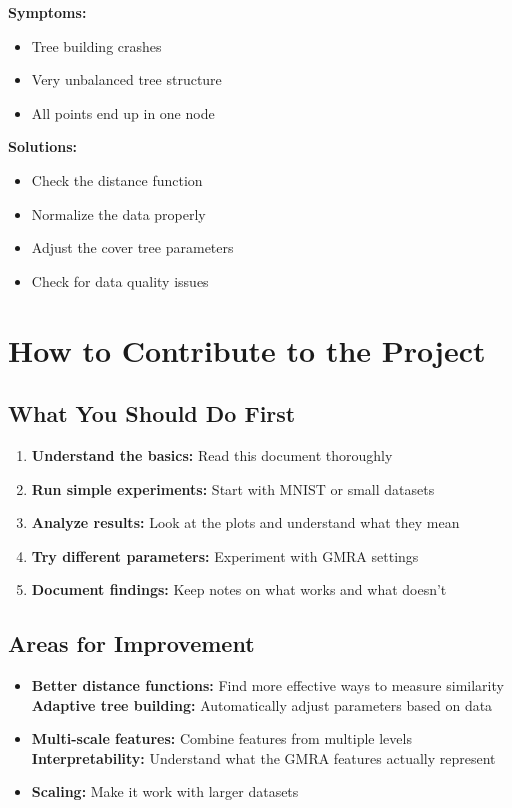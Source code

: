 \documentclass[12pt]{article}
\begin{document}
\textbf{Symptoms:}
\begin{itemize}
    \item Tree building crashes
    \item Very unbalanced tree structure
    \item All points end up in one node
\end{itemize}

\textbf{Solutions:}
\begin{itemize}
    \item Check the distance function
    \item Normalize the data properly
    \item Adjust the cover tree parameters
    \item Check for data quality issues
\end{itemize}

\section{How to Contribute to the Project}

\subsection{What You Should Do First}

\begin{enumerate}
    \item \textbf{Understand the basics:} Read this document thoroughly
    \item \textbf{Run simple experiments:} Start with MNIST or small datasets
    \item \textbf{Analyze results:} Look at the plots and understand what they mean
    \item \textbf{Try different parameters:} Experiment with GMRA settings
    \item \textbf{Document findings:} Keep notes on what works and what doesn't
\end{enumerate}

\subsection{Areas for Improvement}

\begin{itemize}
    \item \textbf{Better distance functions:} Find more effective ways to measure similarity
    \textbf{Adaptive tree building:} Automatically adjust parameters based on data
    \item \textbf{Multi-scale features:} Combine features from multiple levels
    \textbf{Interpretability:} Understand what the GMRA features actually represent
    \item \textbf{Scaling:} Make it work with larger datasets
\end{itemize}
\end{document}
